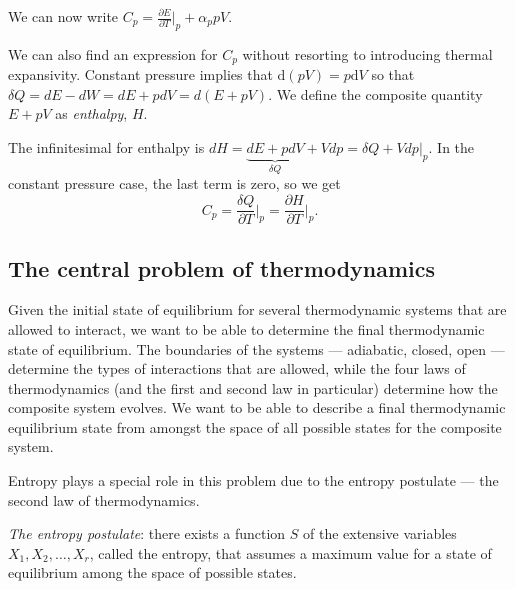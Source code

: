 We can now write $C_p = \frac{\partial E}{\partial T}\vert_{p} + \alpha_p pV$. 


We can also find an expression for $C_p$ without resorting to introducing thermal expansivity. Constant pressure implies that $\mathrm{d}(pV)=p\mathrm{d}V$ so that $\delta Q = dE - dW = dE +pdV = d(E+pV)$. We define the composite quantity $E+pV$ as \emph{enthalpy}, $H$.

The infinitesimal for enthalpy is $dH = \underbrace{dE +pdV}_{\delta Q}+ Vdp = \delta Q + Vdp\vert_{p}$. In the constant pressure case, the last term is zero, so we get 
$$
	C_p = \frac{\delta Q}{\partial T}\bigg\vert_{p} = \frac{\partial H}{\partial T}\bigg\vert_{p}. 
$$




\subsection{The central problem of thermodynamics}
Given the initial state of equilibrium for several thermodynamic systems that are allowed to interact, we want to be able to determine the final thermodynamic state of equilibrium. The boundaries of the systems --- adiabatic, closed, open --- determine the types of interactions that are allowed, while the four laws of thermodynamics (and the first and second law in particular) determine how the composite system evolves. We want to be able to describe a final thermodynamic equilibrium state from amongst the space of all possible states for the composite system.

Entropy plays a special role in this problem due to the entropy postulate --- the second law of thermodynamics.

\emph{The entropy postulate}: there exists a function $S$ of the extensive variables $X_1,X_2,\ldots,X_r$, called the entropy, that assumes a maximum value for a state of equilibrium among the space of possible states.

